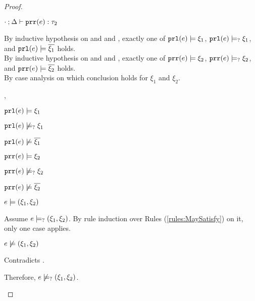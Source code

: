 \begin{proof}
\begin{byCases}
\begin{byCases}
\begin{pfsteps*}
        \item $\cdot \mathbin{;} \Delta \vdash \mathtt{prr}(e) : \tau_2$  
        \end{pfsteps*}
        By inductive hypothesis on  and  and , exactly one of $\mathtt{prl}(e) \models \xi_1$, $\mathtt{prl}(e) \models_{?} \xi_1$, and $\mathtt{prl}(e) \models \overline{\xi_1}$ holds. \\
        By inductive hypothesis on  and  and , exactly one of $\mathtt{prr}(e) \models \xi_2$, $\mathtt{prr}(e) \models_{?} \xi_2$, and $\mathtt{prr}(e) \models \overline{\xi_2}$ holds. \\
        By case analysis on which conclusion holds for $\xi_1$ and $\xi_2$.
        \begin{byCases}
        \item[\csatisfy{\hprl{e}}{\xi_1},\csatisfy{\hprr{e}}{\xi_2}]
            \begin{pfsteps*}
            \item $\mathtt{prl}(e) \models \xi_1$  
            \item $\mathtt{prl}(e) \not\models_{?} \xi_1$  
            \item $\mathtt{prl}(e) \not\models \overline{\xi_1}$  
            \item $\mathtt{prr}(e) \models \xi_2$  
            \item $\mathtt{prr}(e) \not\models_{?} \xi_2$  
            \item $\mathtt{prr}(e) \not\models \overline{\xi_2}$  
            \item $e \models (\xi_1 , \xi_2)$  
            \end{pfsteps*}
            Assume $e \models_{?} (\xi_1 , \xi_2)$. By rule induction over Rules (\ref{rules:MaySatisfy}) on it, only one case applies.
            \begin{byCases}
            \item[\text{(\ref{rule:CMSNotVal})}]
                \begin{pfsteps*}
                \item $e \not\models (\xi_1 , \xi_2)$ 
                \end{pfsteps*}
                Contradicts .
            \end{byCases}
            Therefore, $e \not\models_{?} (\xi_1 , \xi_2)$.
            

\end{byCases}
\end{byCases}
\end{byCases}
\end{proof}
